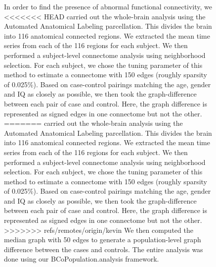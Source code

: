 \documentclass{nature}
\begin{document}
\begin{figure}[tb]
In order to find the presence of abnormal functional connectivity, we 
<<<<<<< HEAD
carried out the whole-brain analysis using the Automated Anatomical Labeling\cite{tzourio2002automated} parcellation. This divides the brain into
116 anatomical connected regions. We extracted the mean time series from each
of the 116 regions for each subject. We then performed a subject-level connectome
analysis using neighborhood selection\cite{meinshausen2006high}. For
each subject, we chose the tuning
parameter of this method to estimate a connectome with 150 edges (roughly sparsity
of 0.025\%). 
Based on case-control pairings matching the age, gender and IQ as closely as possible,
we then took the graph-difference between each pair of case and control. Here,
the graph difference is represented as signed edges in one connectome but not the other. 
=======
carried out the whole-brain analysis using the Automated Anatomical
Labeling\cite{tzourio2002automated} parcellation. This divides the brain into
116 anatomical connected regions. We extracted the mean time series from each
of the 116 regions for each subject. We then performed a subject-level
connectome
analysis using neighborhood selection\cite{meinshausen2006high}. For
each subject, we chose the tuning
parameter of this method to estimate a connectome with 150 edges (roughly
sparsity
of 0.025\%). 
Based on case-control pairings matching the age, gender and IQ as closely as
possible,
we then took the graph-difference between each pair of case and control. Here,
the graph difference is represented as signed edges in one connectome but not
the other. 
>>>>>>> refs/remotes/origin/kevin
We then computed the median graph\cite{han2013sparse} with 
50 edges 
to generate a population-level graph difference between the cases and controls.
The entire analysis was done using our BCoPopulation.analysis framework.


\end{figure}
\end{document}

